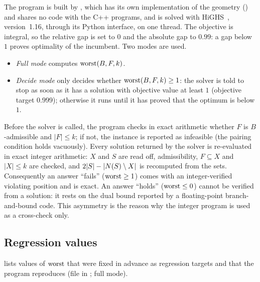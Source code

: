 The program is built by , which has its own implementation of the geometry
() and shares no code with the C++ programs, and is solved with HiGHS~\cite{HuangfuHall2018},
version~1.16, through its Python interface, on one thread. The objective is integral, so the relative gap
is set to $0$ and the absolute gap to $0.99$: a gap below $1$ proves optimality of the incumbent. Two
modes are used.
\begin{itemize}[leftmargin=1.6em]
\item \emph{Full mode} computes $\operatorname{worst}(B,F,k)$.
\item \emph{Decide mode} only decides whether $\operatorname{worst}(B,F,k)\ge1$: the solver is told to stop as soon as it
  has a solution with objective value at least $1$ (objective target $0.999$); otherwise it runs until it
  has proved that the optimum is below $1$.
\end{itemize}
Before the solver is called, the program checks in exact arithmetic whether $F$ is $B$-admissible and
$|F|\le k$; if not, the instance is reported as infeasible (the pairing condition holds vacuously). Every
solution returned by the solver is re-evaluated in exact integer arithmetic: $X$ and $S$ are read off,
admissibility, $F\subseteq X$ and $|X|\le k$ are checked, and $2|S|-|N(S)\setminus X|$ is recomputed from the
sets. Consequently an answer ``fails'' ($\operatorname{worst}\ge1$) comes with an integer-verified violating position and
is exact. An answer ``holds'' ($\operatorname{worst}\le0$) cannot be verified from a solution: it rests on the dual bound
reported by a floating-point branch-and-bound code. This asymmetry is the reason why the integer program
is used as a cross-check only.

\subsection{Regression values}\label{ssec:ip-regression}

 lists values of $\operatorname{worst}$ that were fixed in advance as regression targets and
that the program reproduces (file  in ; full mode).

